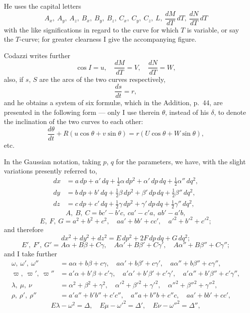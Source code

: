 \documentclass[11pt,a4paper]{article}
\begin{document}
He uses the capital letters
\[
A_x,\ A_y,\ A_z,\ B_x,\ B_y,\ B_z,\ C_x,\ C_y,\ C_z,\ L,\ \frac{dM}{dT}\,dT,\ \frac{dN}{dT}\,dT
\]
with the like significations in regard to the curve for which $T$ is variable, or say
the $T$-curve; for greater clearness I give the accompanying figure.

Codazzi writes further
\[
\cos I = u, \quad
\frac{dM}{dT} = V, \quad
\frac{dN}{dT} = W,
\]
also, if $s$, $S$ are the arcs of the two curves respectively,
\[
\frac{ds}{dt} = r,
\]
and he obtains a system of six formul\ae, which in the Addition, p.\ 44, are presented
in the following form --- only I use therein $\theta$, instead of his $\delta$, to denote the
inclination of the two curves to each other:
\[
\frac{d\theta}{dt} + R(u\cos\theta + v\sin\theta) = r(U\cos\theta + W\sin\theta),
\]
etc.

In the Gaussian notation, taking $p$, $q$ for the parameters, we have, with the slight
variations presently referred to,
\begin{align*}
dx &= a\,dp + a'\,dq + \tfrac12\alpha\,dp^2 + \alpha'\,dp\,dq + \tfrac12\alpha''\,dq^2,\\
dy &= b\,dp + b'\,dq + \tfrac12\beta\,dp^2 + \beta'\,dp\,dq + \tfrac12\beta''\,dq^2,\\
dz &= c\,dp + c'\,dq + \tfrac12\gamma\,dp^2 + \gamma'\,dp\,dq + \tfrac12\gamma''\,dq^2,
\end{align*}
\[
A,\ B,\ C = bc' - b'c,\ ca' - c'a,\ ab' - a'b,
\]
\[
E,\ F,\ G = a^2 + b^2 + c^2,\quad aa' + bb' + cc',\quad a'^2 + b'^2 + c'^2;
\]
and therefore
\[
dx^2 + dy^2 + dz^2 = E\,dp^2 + 2F\,dp\,dq + G\,dq^2;
\]
\[
E',\ F',\ G' = A\alpha + B\beta + C\gamma,\quad A\alpha' + B\beta' + C\gamma',\quad
A\alpha'' + B\beta'' + C\gamma'';
\]
and I take further
\begin{align*}
\omega,\ \omega',\ \omega'' &= a\alpha + b\beta + c\gamma,\quad a\alpha' + b\beta' + c\gamma',\quad
a\alpha'' + b\beta'' + c\gamma'',\\
\varpi,\ \varpi',\ \varpi'' &= a'\alpha + b'\beta + c'\gamma,\quad a'\alpha' + b'\beta' + c'\gamma',\quad
a'\alpha'' + b'\beta'' + c'\gamma'',\\
\lambda,\ \mu,\ \nu &= \alpha^2 + \beta^2 + \gamma^2,\quad \alpha'^2 + \beta'^2 + \gamma'^2,\quad
\alpha''^2 + \beta''^2 + \gamma''^2,\\
\rho,\ \rho',\ \rho'' &= a'a'' + b'b'' + c'c'',\quad a''a + b''b + c''c,\quad aa' + bb' + cc',
\end{align*}
\[
E\lambda - \omega^2 = \Delta, \quad E\mu - \omega'^2 = \Delta', \quad
E\nu - \omega''^2 = \Delta'',
\]
\end{document}
